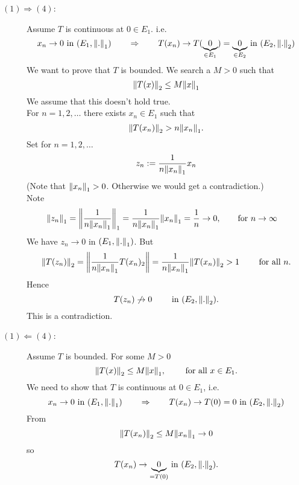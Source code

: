 \begin{beweis}
	\begin{description}
		\item[$(1) \Rightarrow (4)$:] Assume $T$ is continuous at $0 \in E_1$. i.e. 
		\[
			x_n \to 0 \text{ in }(E_1, \norm{.}_1) \qquad \Rightarrow \qquad T(x_n) \to T(\underset{\in E_1}{\underbrace{0}}) = \underset{\in E_2}{\underbrace{0}} \text{ in }(E_2,\norm{.}_2)
		\] 
		We want to prove that $T$ is bounded. We search a $M>0$ such that
		\[
			\norm{T(x)}_2 \leq  M \norm{x}_1
		\]
		We assume that this doesn't hold true. \\
		For $n=1,2,\dots$ there exists $x_n \in E_1$ such that 
		\[
			\norm{T(x_n)}_2 > n \norm{x_n}_1.
		\]
		Set for $n=1,2,\dots$
		\[
			z_n := \frac{1}{n \norm{x_n}_1}x_n
		\]
		(Note that $\norm{x_n}_1 >0$. Otherwise we would get a contradiction.) \\
		Note
		\begin{align*}
		\norm{z_n}_1 &= \norm{\frac{1}{n \norm{x_n}_1}}_1 = \frac{1}{n \norm{x_n}_1} \norm{x_n}_1 = \frac{1}{n} \to 0, \qquad \text{for }n \to \infty
		\end{align*}
		We have $z_n \to 0$ in $(E_1,\norm{.}_1)$. But 
		\[
			\norm{T(z_n)}_2 = \norm{\frac{1}{n \norm{x_n}_1}T(x_n)_2} = \frac{1}{n \norm{x_n}_1} \norm{T(x_n)}_2 > 1 \qquad \text{ for all }n.
		\]
		Hence
		\[
			T(z_n) \not \to 0 \qquad \text{ in }(E_2, \norm{.}_2).
		\]
		This is a contradiction.
		\item[$(1) \Leftarrow (4)$:] Assume $T$ is bounded. For some $M > 0$ 
		\[
			\norm{T(x)}_2 \leq M \norm{x}_1, \qquad \text{ for all }x \in E_1.
		\] 
		We need to show that $T$ is continuous at $0 \in E_1$, i.e.
		\[
			x_n \to 0 \text{ in } (E_1, \norm{.}_1) \qquad \Rightarrow \qquad T(x_n) \to T(0) = 0 \text{ in } (E_2, \norm{.}_2)
		\]
		From \[
			\norm{T(x_n)}_2 \leq  M \norm{x_n}_1 \to 0
		\]
		so
		\[
			T(x_n) \to \underset{=T(0)}{\underbrace{0}} \text{ in }(E_2, \norm{.}_2).
		\]
	\end{description}
\end{beweis}
